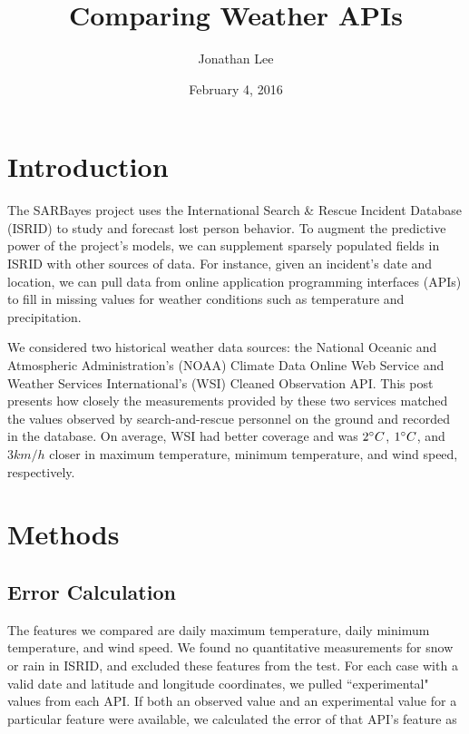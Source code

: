 \documentclass[12pt]{article}
\begin{document}
  \title{Comparing Weather APIs}
  \author{Jonathan Lee}
  \date{February 4, 2016}
  \maketitle

  \section{Introduction}
    The SARBayes project uses the International Search \& Rescue Incident
    Database (ISRID) \cite{isrid} to study and forecast lost person behavior.
    To augment the predictive power of the project's models, we can
    supplement sparsely populated fields in ISRID with other sources of data.
    For instance, given an incident's date and location, we can pull data from
    online application programming interfaces (APIs) to fill in missing values
    for weather conditions such as temperature and precipitation.

    We considered two historical weather data sources: the National Oceanic and
    Atmospheric Administration's (NOAA) Climate Data Online Web Service and
    Weather Services International's (WSI) Cleaned Observation API. This post
    presents how closely the measurements provided by these two services
    matched the values observed by search-and-rescue personnel on the ground
    and recorded in the database. On average, WSI had better coverage and was
    \(2 \degree C\), \(1 \degree C\), and \(3 km/h\) closer in maximum
    temperature, minimum temperature, and wind speed, respectively.

  \section{Methods}
    \subsection{Error Calculation}
      The features we compared are daily maximum temperature, daily minimum
      temperature, and wind speed. We found no quantitative measurements for
      snow or rain in ISRID, and excluded these features from the test. For
      each case with a valid date and latitude and longitude coordinates, we
      pulled ``experimental" values from each API. If both an observed value and
      an experimental value for a particular feature were available, we
      calculated the error of that API's feature as
\end{document}
